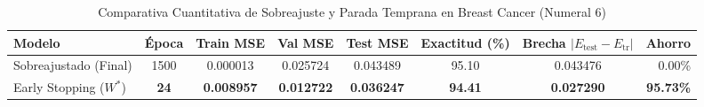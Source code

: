 \begin{table}[htbp]
    \centering
    \small
    \caption{Comparativa Cuantitativa de Sobreajuste y Parada Temprana en Breast Cancer (Numeral 6)}
    \label{tab:sobreajuste_early_stopping}
    \begin{tabular}{lccccccr}
        \toprule
        \textbf{Modelo} & \textbf{Época} & \textbf{Train MSE} & \textbf{Val MSE} & \textbf{Test MSE} & \textbf{Exactitud (\%)} & \textbf{Brecha $|E_{\text{test}}-E_{\text{tr}}|$} & \textbf{Ahorro} \\
        \midrule
        Sobreajustado (Final)    & 1500 & 0.000013 & 0.025724 & 0.043489 & 95.10 & 0.043476 & 0.00\% \\
        Early Stopping ($W^*$)   & \textbf{24}  & \textbf{0.008957} & \textbf{0.012722} & \textbf{0.036247} & \textbf{94.41} & \textbf{0.027290} & \textbf{95.73\%} \\
        \bottomrule
    \end{tabular}
\end{table}
